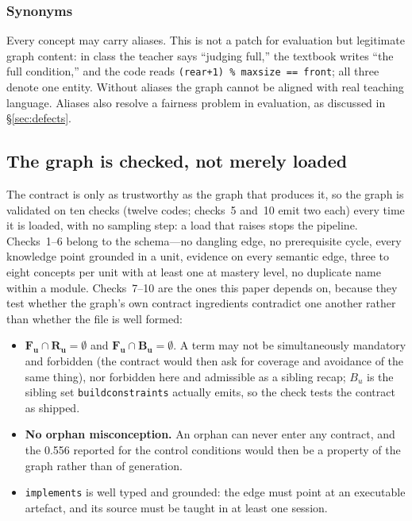 \documentclass[review,12pt]{elsarticle}
\renewcommand{\_}{\kgunderscore\allowbreak}
\newcommand{\id}[1]{\texttt{#1}}
\begin{document}
\subsubsection{Synonyms}

Every concept may carry aliases. This is not a patch for evaluation but
legitimate graph content: in class the teacher says ``judging full,'' the
textbook writes ``the full condition,'' and the code reads
\id{(rear+1) \% maxsize == front}; all three denote one entity. Without aliases
the graph cannot be aligned with real teaching language. Aliases also resolve a
fairness problem in evaluation, as discussed in \S\ref{sec:defects}.

\subsection{The graph is checked, not merely loaded}
\label{sec:graph-checks}

The contract is only as trustworthy as the graph that produces it, so the graph
is validated on ten checks (twelve codes; checks~5 and~10 emit two each) every
time it is loaded, with no sampling step: a load that raises stops the pipeline.
Checks~1--6 belong to the schema---no dangling edge, no prerequisite cycle, every
knowledge point grounded in a unit, evidence on every semantic edge, three to
eight concepts per unit with at least one at mastery level, no duplicate name
within a module. Checks~7--10 are the ones this paper depends on, because they
test whether the graph's own contract ingredients contradict one another rather
than whether the file is well formed:

\begin{itemize}
  \item $\mathbf{F_u \cap R_u = \emptyset}$ and $\mathbf{F_u \cap B_u =
  \emptyset}$. A term may not be simultaneously mandatory and forbidden (the
  contract would then ask for coverage and avoidance of the same thing), nor
  forbidden here and admissible as a sibling recap; $B_u$ is the sibling set
  \id{build\_constraints} actually emits, so the check tests the contract as
  shipped.
  \item \textbf{No orphan misconception.} An orphan can never enter any contract,
  and the 0.556 reported for the control conditions would then be a property of
  the graph rather than of generation.
  \item \id{implements} is well typed and grounded: the edge must point at
  an executable artefact, and its source must be taught in at least one session.
\end{itemize}
\end{document}

